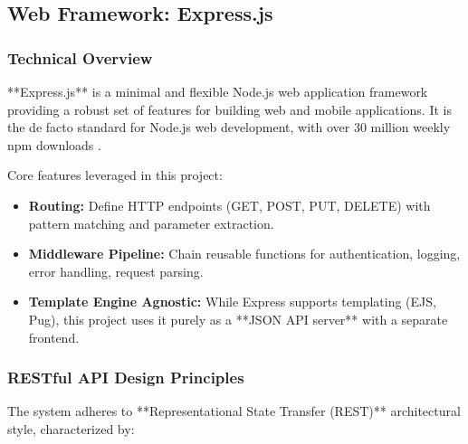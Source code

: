 \documentclass[12pt, a4paper]{report}
\begin{document}
\subsection{Web Framework: Express.js}

\subsubsection{Technical Overview}

**Express.js** is a minimal and flexible Node.js web application framework providing a robust set of features for building web and mobile applications. It is the de facto standard for Node.js web development, with over 30 million weekly npm downloads \cite{npm2024}.

Core features leveraged in this project:

\begin{itemize}
    \item \textbf{Routing:} Define HTTP endpoints (GET, POST, PUT, DELETE) with pattern matching and parameter extraction.
    \item \textbf{Middleware Pipeline:} Chain reusable functions for authentication, logging, error handling, request parsing.
    \item \textbf{Template Engine Agnostic:} While Express supports templating (EJS, Pug), this project uses it purely as a **JSON API server** with a separate frontend.
\end{itemize}

\subsubsection{RESTful API Design Principles}

The system adheres to **Representational State Transfer (REST)** architectural style, characterized by:
\end{document}
